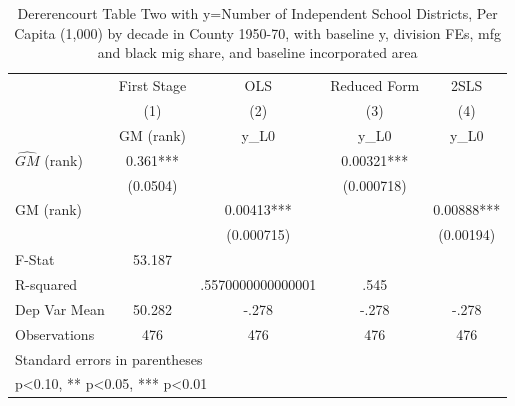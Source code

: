 \begin{table}[htbp]\centering
\def\sym#1{\ifmmode^{#1}\else\(^{#1}\)\fi}
\caption{Dererencourt Table Two with y=Number of Independent School Districts, Per Capita (1,000) by decade in County 1950-70, with baseline y, division FEs, mfg and black mig share, and baseline incorporated area}
\begin{tabular}{l*{4}{c}}
\toprule
                    & First Stage   &         OLS   &Reduced Form   &        2SLS   \\
                    &\multicolumn{1}{c}{(1)}&\multicolumn{1}{c}{(2)}&\multicolumn{1}{c}{(3)}&\multicolumn{1}{c}{(4)}\\
                    &\multicolumn{1}{c}{GM  (rank)}&\multicolumn{1}{c}{y\_L0}&\multicolumn{1}{c}{y\_L0}&\multicolumn{1}{c}{y\_L0}\\
\midrule
$\hat{GM}$ (rank)   &       0.361***&               &     0.00321***&               \\
                    &    (0.0504)   &               &  (0.000718)   &               \\
\addlinespace
GM  (rank)          &               &     0.00413***&               &     0.00888***\\
                    &               &  (0.000715)   &               &   (0.00194)   \\
\midrule
F-Stat              &      53.187   &               &               &               \\
R-squared           &               &.5570000000000001   &        .545   &               \\
Dep Var Mean        &      50.282   &       -.278   &       -.278   &       -.278   \\
Observations        &         476   &         476   &         476   &         476   \\
\bottomrule
\multicolumn{5}{l}{\footnotesize Standard errors in parentheses}\\
\multicolumn{5}{l}{\footnotesize * p<0.10, ** p<0.05, *** p<0.01}\\
\end{tabular}
\end{table}
